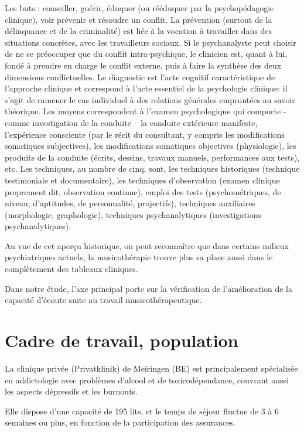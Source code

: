 Les buts : conseiller, guérir, éduquer (ou rééduquer par la psychopédagogie clinique), voir prévenir et résoudre un conflit. La prévention (surtout de la délinquance et de la criminalité) est liée à la vocation à travailler dans des situations concrètes, avec les travailleurs sociaux.
Si le psychanalyste peut choisir de ne se préoccuper que du conflit intra-psychique, le clinicien est, quant à lui, fondé à prendre en charge le conflit externe, puis à faire la synthèse des deux dimensions conflictuelles.
Le diagnostic est l’acte cognitif caractéristique de l’approche clinique et correspond à l’acte essentiel de la psychologie clinique: il s’agit de ramener le cas individuel à des relations générales empruntées au savoir théorique.
Les moyens correspondent à l’examen psychologique qui comporte - comme investigation de la conduite – la conduite extérieure manifeste, l’expérience consciente (par le récit du consultant, y compris les modifications somatiques subjectives), les modifications somatiques objectives (physiologie), les produits de la conduite (écrits, dessins, travaux manuels, performances aux tests), etc.
Les techniques, au nombre de cinq, sont, les techniques historiques (technique testimoniale et documentaire), les techniques d’observation (examen clinique proprement dit, observation continue), emploi des tests (psychométriques, de niveau, d’aptitudes, de personnalité, projectifs), techniques auxiliaires (morphologie, graphologie), techniques psychanalytiques (investigations psychanalytiques).

Au vue de cet aperçu historique, on peut reconnaître que
dans certains milieux psychiatriques actuels, la musicothérapie trouve
plus sa place aussi dans le complètement des tableaux cliniques.

Dans notre étude, l'axe principal porte sur la
vérification de l'amélioration de
la capacité d'écoute suite au travail musicothérapeutique.

\section{Cadre de travail, population}

 La clinique privée (Privatklinik)
de Meiringen (BE) est  principalement spécialisée en
addictologie avec problèmes d'alcool et de toxicodépendance, couvrant aussi les aspects dépressifs
et les
burnouts.


Elle dispose d'une capacité de 195 lits, et le temps de séjour fluctue de 3 à 6 semaines ou plus, en
fonction de la participation des assurances.

